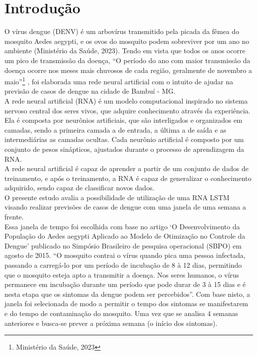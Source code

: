 \documentclass[
	article,			%
	12pt,				%
	a4paper,			%
	chapter=TITLE,		%
	section=TITLE,		%
	subsection=TITLE,	%
	subsubsection=TITLE %
	english,			%
	brazil,				%
	sumario=tradicional
	]{abntex2}
\begin{document}
\section{Introdução}

O vírus dengue (DENV) é um arbovírus transmitido pela picada da fêmea do mosquito Aedes aegypti, 
e os ovos do mosquito podem sobreviver por um ano no ambiente (Ministério da Saúde, 2023). 
    Tendo em vista que todos os anos ocorre um pico de transmissão da doença, “O período do ano com maior transmissão da doença ocorre nos meses mais chuvosos de cada região, geralmente de novembro a maio”\thanks{Ministério da Saúde, 2023}
, foi elaborada uma rede neural artificial com o intuito de ajudar na previsão de casos de dengue na cidade de Bambuí - MG.
\\
\indent
A rede neural artificial (RNA) é um modelo computacional inspirado no sistema nervoso central dos seres vivos, que adquire conhecimento através da experiência. Ela é composta por neurônios artificiais, que são interligados e organizados em camadas, sendo a primeira camada a de entrada, a última a de saída e as intermediárias as camadas ocultas. Cada neurônio artificial é composto por um conjunto de pesos sinápticos, ajustados durante o processo de aprendizagem da RNA.
\\ \indent A rede neural artificial é capaz de aprender a partir de um conjunto de dados de treinamento, e após o treinamento, a RNA é capaz de generalizar o conhecimento adquirido, sendo capaz de classificar novos dados.
\\ \indent
O presente estudo avalia a possibilidade de utilização de uma RNA LSTM visando realizar previsões de casos de dengue com uma janela de uma semana a frente.
\\ \indent
Essa janela de tempo foi escolhida com base no artigo ‘O Desenvolvimento da População do Aedes aegypti Aplicado ao Modelo de Otimização no Controle da Dengue’ 
publicado no Simpósio Brasileiro de pesquisa operacional (SBPO) em agosto de 2015. 
“O mosquito contrai o vírus quando pica uma pessoa infectada, passando a carregá-lo por um período de incubação de 8 à 12 dias,
 permitindo que o mosquito esteja apto a transmitir a doença. 
 Nos seres humanos, o vírus permanece em incubação durante um período que pode durar de 3 à 15 dias e é nesta etapa que os
 sintomas da dengue podem ser percebidos”. Com base nisto, a janela foi selecionada de modo a permitir o tempo dos sintomas
 se manifestarem e do tempo de contaminação do mosquito. Uma vez que se analisa 4 semanas anteriores e busca-se prever a próxima semana 
 (o início dos sintomas).
\end{document}
